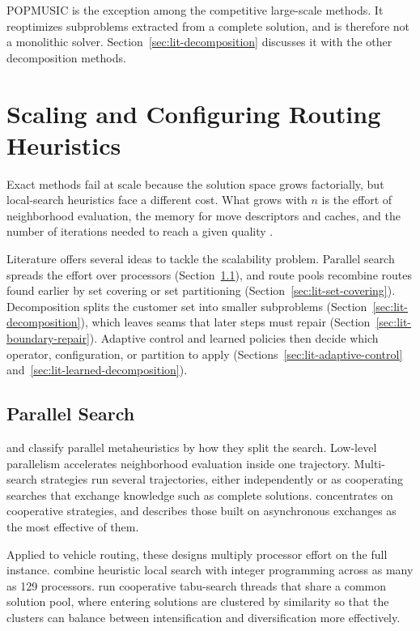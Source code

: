 POPMUSIC \citep{queirogaPOPMUSICMatheuristic2021} is the exception among the competitive large-scale methods. It reoptimizes subproblems extracted from a complete solution, and is therefore not a monolithic solver. Section~\ref{sec:lit-decomposition} discusses it with the other decomposition methods.

\section{Scaling and Configuring Routing Heuristics}\label{sec:lit-scalability}

Exact methods fail at scale because the solution space grows factorially, but local-search heuristics face a different cost. What grows with $n$ is the effort of neighborhood evaluation, the memory for move descriptors and caches, and the number of iterations needed to reach a given quality \citep{accorsiFastScalableHeuristic2021,efficiently_arnold_2019}.

Literature offers several ideas to tackle the scalability problem. Parallel search spreads the effort over processors (Section~\ref{sec:lit-parallelization}), and route pools recombine routes found earlier by set covering or set partitioning (Section~\ref{sec:lit-set-covering}). Decomposition splits the customer set into smaller subproblems (Section~\ref{sec:lit-decomposition}), which leaves seams that later steps must repair (Section~\ref{sec:lit-boundary-repair}). Adaptive control and learned policies then decide which operator, configuration, or partition to apply (Sections~\ref{sec:lit-adaptive-control} and~\ref{sec:lit-learned-decomposition}).

\subsection{Parallel Search}\label{sec:lit-parallelization}

\citet{crainicParallelSolutionMethods2008} and \citet{crainic2019parallel} classify parallel metaheuristics by how they split the search. Low-level parallelism accelerates neighborhood evaluation inside one trajectory. Multi-search strategies run several trajectories, either independently or as cooperating searches that exchange knowledge such as complete solutions. \citet{crainic2019parallel} concentrates on cooperative strategies, and describes those built on asynchronous exchanges as the most effective of them.

Applied to vehicle routing, these designs multiply processor effort on the full instance. \citet{groerParallelAlgorithmVehicle2011} combine heuristic local search with integer programming across as many as 129 processors. \citet{jinCooperativeParallelMetaheuristic2014} run cooperative tabu-search threads that share a common solution pool, where entering solutions are clustered by similarity so that the clusters can balance between intensification and diversification more effectively.

